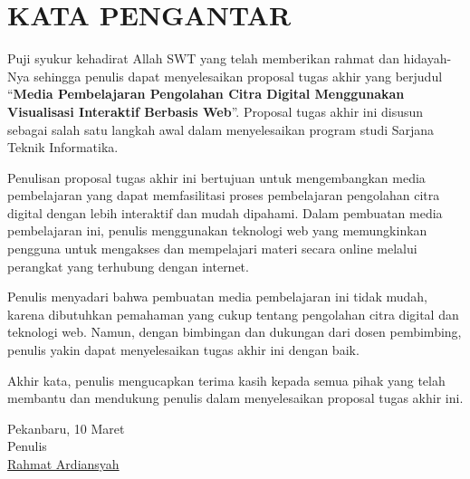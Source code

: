 \chapter*{\centering KATA PENGANTAR}

Puji syukur kehadirat Allah SWT yang telah memberikan rahmat dan hidayah-Nya sehingga penulis dapat menyelesaikan proposal tugas akhir yang berjudul ``\textbf{Media Pembelajaran Pengolahan Citra Digital Menggunakan Visualisasi Interaktif Berbasis Web}''. Proposal tugas akhir ini disusun sebagai salah satu langkah awal dalam menyelesaikan program studi Sarjana Teknik Informatika.

Penulisan proposal tugas akhir ini bertujuan untuk mengembangkan media pembelajaran yang dapat memfasilitasi proses pembelajaran pengolahan citra digital dengan lebih interaktif dan mudah dipahami. Dalam pembuatan media pembelajaran ini, penulis menggunakan teknologi web yang memungkinkan pengguna untuk mengakses dan mempelajari materi secara online melalui perangkat yang terhubung dengan internet.

Penulis menyadari bahwa pembuatan media pembelajaran ini tidak mudah, karena dibutuhkan pemahaman yang cukup tentang pengolahan citra digital dan teknologi web. Namun, dengan bimbingan dan dukungan dari dosen pembimbing, penulis yakin dapat menyelesaikan tugas akhir ini dengan baik.

Akhir kata, penulis mengucapkan terima kasih kepada semua pihak yang telah membantu dan mendukung penulis dalam menyelesaikan proposal tugas akhir ini.

\vspace{1cm}
\begin{flushright}
	Pekanbaru, 10 Maret \the\year{}\\
	Penulis\\
	\vspace{2cm}
	{\underline{Rahmat Ardiansyah}}
\end{flushright}
